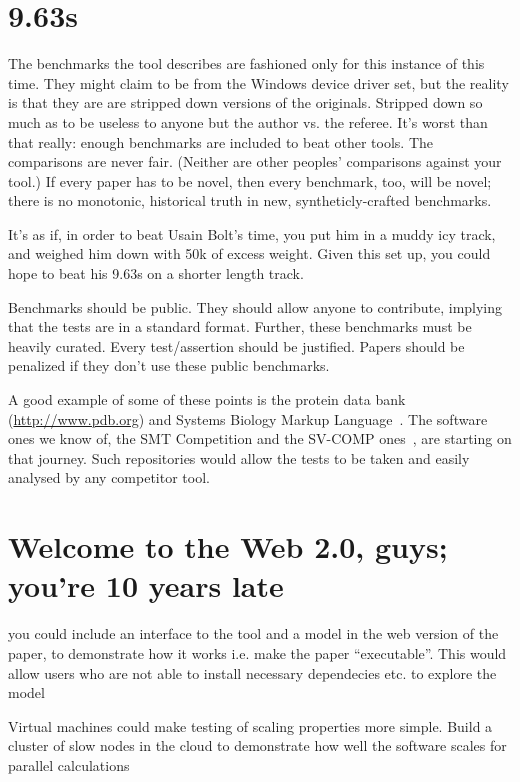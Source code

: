 \documentclass[conference]{IEEEtran}
\begin{document}
\section{9.63s} 

The benchmarks the tool describes are fashioned only for this instance
of this time. They might claim to be from the Windows device driver
set, but the reality is that they are are stripped down versions of
the originals. Stripped down so much as to be useless to anyone but
the author vs. the referee. It's worst than that really: enough
benchmarks are included to beat other tools. The comparisons are never
fair. (Neither are other peoples' comparisons against your tool.) If
every paper has to be novel, then every benchmark, too, will be novel;
there is no monotonic, historical truth in new, syntheticly-crafted
benchmarks.

It's as if, in order to beat Usain Bolt's time, you put him in a muddy
icy track, and weighed him down with 50k of excess weight. Given this
set up, you could hope to beat his 9.63s on a shorter length track.

Benchmarks should be public. They should allow anyone to contribute,
implying that the tests are in a standard format. Further, these
benchmarks must be heavily curated. Every test/assertion should be
justified. Papers should be penalized if they don't use these public
benchmarks.

A good example of some of these points is the protein data bank
(\url{http://www.pdb.org}) and Systems Biology Markup
Language~\cite{Hucka2003,Chaouiya2013}. The software ones we know of,
the SMT Competition and the SV-COMP ones~\cite{SMTComp, SVCOMP}, are
starting on that journey. Such repositories would allow the tests to
be taken and easily analysed by any competitor tool. 

\section{Welcome to the Web 2.0, guys; you're 10 years late} 

you could include an interface to the tool and a model in the web
version of the paper, to demonstrate how it works i.e. make the paper
``executable''. This would allow users who are not able to install
necessary dependecies etc. to explore the model \cite{Hall2014}

Virtual machines could make testing of scaling properties more simple. 
Build a cluster of slow nodes in the cloud to demonstrate how well the
software scales for parallel calculations
\end{document}
